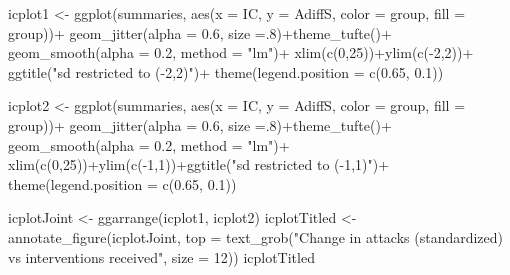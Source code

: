 \documentclass[
  10pt,
  dvipsnames,enabledeprecatedfontcommands]{scrartcl}
\newenvironment{Shaded}{\begin{snugshade}}{\end{snugshade}}
\newcommand{\AttributeTok}[1]{\textcolor[rgb]{0.77,0.63,0.00}{#1}}
\newcommand{\DecValTok}[1]{\textcolor[rgb]{0.00,0.00,0.81}{#1}}
\newcommand{\FloatTok}[1]{\textcolor[rgb]{0.00,0.00,0.81}{#1}}
\newcommand{\FunctionTok}[1]{\textcolor[rgb]{0.00,0.00,0.00}{#1}}
\newcommand{\NormalTok}[1]{#1}
\newcommand{\OtherTok}[1]{\textcolor[rgb]{0.56,0.35,0.01}{#1}}
\newcommand{\SpecialCharTok}[1]{\textcolor[rgb]{0.00,0.00,0.00}{#1}}
\newcommand{\StringTok}[1]{\textcolor[rgb]{0.31,0.60,0.02}{#1}}
\begin{document}
\begin{Shaded}
\begin{Highlighting}[]
\NormalTok{icplot1 }\OtherTok{\textless{}{-}} \FunctionTok{ggplot}\NormalTok{(summaries, }\FunctionTok{aes}\NormalTok{(}\AttributeTok{x =}\NormalTok{ IC, }\AttributeTok{y =}\NormalTok{ AdiffS, }\AttributeTok{color =}\NormalTok{ group, }\AttributeTok{fill =}\NormalTok{ group))}\SpecialCharTok{+}
  \FunctionTok{geom\_jitter}\NormalTok{(}\AttributeTok{alpha =} \FloatTok{0.6}\NormalTok{, }\AttributeTok{size =}\NormalTok{.}\DecValTok{8}\NormalTok{)}\SpecialCharTok{+}\FunctionTok{theme\_tufte}\NormalTok{()}\SpecialCharTok{+}
  \FunctionTok{geom\_smooth}\NormalTok{(}\AttributeTok{alpha =} \FloatTok{0.2}\NormalTok{, }\AttributeTok{method =} \StringTok{"lm"}\NormalTok{)}\SpecialCharTok{+}
  \FunctionTok{xlim}\NormalTok{(}\FunctionTok{c}\NormalTok{(}\DecValTok{0}\NormalTok{,}\DecValTok{25}\NormalTok{))}\SpecialCharTok{+}\FunctionTok{ylim}\NormalTok{(}\FunctionTok{c}\NormalTok{(}\SpecialCharTok{{-}}\DecValTok{2}\NormalTok{,}\DecValTok{2}\NormalTok{))}\SpecialCharTok{+}
  \FunctionTok{ggtitle}\NormalTok{(}\StringTok{"sd restricted to ({-}2,2)"}\NormalTok{)}\SpecialCharTok{+}
  \FunctionTok{theme}\NormalTok{(}\AttributeTok{legend.position =} \FunctionTok{c}\NormalTok{(}\FloatTok{0.65}\NormalTok{, }\FloatTok{0.1}\NormalTok{))}

\NormalTok{icplot2 }\OtherTok{\textless{}{-}}  \FunctionTok{ggplot}\NormalTok{(summaries, }\FunctionTok{aes}\NormalTok{(}\AttributeTok{x =}\NormalTok{ IC, }\AttributeTok{y =}\NormalTok{ AdiffS, }\AttributeTok{color =}\NormalTok{ group, }\AttributeTok{fill =}\NormalTok{ group))}\SpecialCharTok{+}
  \FunctionTok{geom\_jitter}\NormalTok{(}\AttributeTok{alpha =} \FloatTok{0.6}\NormalTok{, }\AttributeTok{size =}\NormalTok{.}\DecValTok{8}\NormalTok{)}\SpecialCharTok{+}\FunctionTok{theme\_tufte}\NormalTok{()}\SpecialCharTok{+}
  \FunctionTok{geom\_smooth}\NormalTok{(}\AttributeTok{alpha =} \FloatTok{0.2}\NormalTok{, }\AttributeTok{method =} \StringTok{"lm"}\NormalTok{)}\SpecialCharTok{+}
  \FunctionTok{xlim}\NormalTok{(}\FunctionTok{c}\NormalTok{(}\DecValTok{0}\NormalTok{,}\DecValTok{25}\NormalTok{))}\SpecialCharTok{+}\FunctionTok{ylim}\NormalTok{(}\FunctionTok{c}\NormalTok{(}\SpecialCharTok{{-}}\DecValTok{1}\NormalTok{,}\DecValTok{1}\NormalTok{))}\SpecialCharTok{+}\FunctionTok{ggtitle}\NormalTok{(}\StringTok{"sd restricted to ({-}1,1)"}\NormalTok{)}\SpecialCharTok{+}
  \FunctionTok{theme}\NormalTok{(}\AttributeTok{legend.position =} \FunctionTok{c}\NormalTok{(}\FloatTok{0.65}\NormalTok{, }\FloatTok{0.1}\NormalTok{))}

\NormalTok{icplotJoint }\OtherTok{\textless{}{-}} \FunctionTok{ggarrange}\NormalTok{(icplot1, icplot2) }
\NormalTok{icplotTitled }\OtherTok{\textless{}{-}} \FunctionTok{annotate\_figure}\NormalTok{(icplotJoint, }
  \AttributeTok{top =} \FunctionTok{text\_grob}\NormalTok{(}\StringTok{"Change in attacks (standardized) vs interventions received"}\NormalTok{,  }\AttributeTok{size =} \DecValTok{12}\NormalTok{))}
\NormalTok{icplotTitled}
\end{Highlighting}
\end{Shaded}
\end{document}
